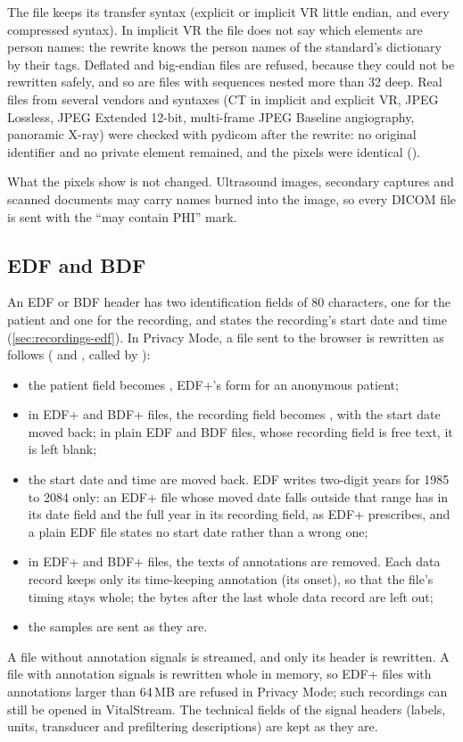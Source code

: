 The file keeps its transfer syntax (explicit or implicit VR little endian, and every compressed
syntax). In implicit VR the file does not say which elements are person names: the rewrite knows
the person names of the standard's dictionary by their tags. Deflated and big-endian files are
refused, because they could not be rewritten safely, and so are files with sequences nested more
than 32 deep.
Real files from several vendors and syntaxes (CT in implicit and explicit VR, JPEG Lossless, JPEG
Extended 12-bit, multi-frame JPEG Baseline angiography, panoramic X-ray) were checked with pydicom
after the rewrite: no original identifier and no private element remained, and the pixels were
identical ().

What the pixels show is not changed. Ultrasound images, secondary captures and scanned documents
may carry names burned into the image, so every DICOM file is sent with the ``may contain PHI''
mark.

\subsection{EDF and BDF}
\label{sec:protecting-edf}

An EDF or BDF header has two identification fields of 80 characters, one for the patient and one
for the recording, and states the recording's start date and time
(\cref{sec:recordings-edf}). In Privacy Mode, a file sent to the browser is rewritten as follows
(  and , called by 
):
\begin{itemize}
\item the patient field becomes , EDF+'s form for an anonymous patient;
\item in EDF+ and BDF+ files, the recording field becomes ,
  with the start date moved back; in plain EDF and BDF files, whose recording field is free
  text, it is left blank;
\item the start date and time are moved back. EDF writes two-digit years for 1985 to 2084 only:
  an EDF+ file whose moved date falls outside that range has  in its date field and the
  full year in its recording field, as EDF+ prescribes, and a plain EDF file states no start date
  rather than a wrong one;
\item in EDF+ and BDF+ files, the texts of annotations are removed. Each data record keeps only
  its time-keeping annotation (its onset), so that the file's timing stays whole; the bytes after
  the last whole data record are left out;
\item the samples are sent as they are.
\end{itemize}
A file without annotation signals is streamed, and only its header is rewritten. A file with
annotation signals is rewritten whole in memory, so EDF+ files with annotations larger than 64\,MB
are refused in Privacy Mode; such recordings can still be opened in VitalStream. The technical
fields of the signal headers (labels, units, transducer and prefiltering descriptions) are kept
as they are.

